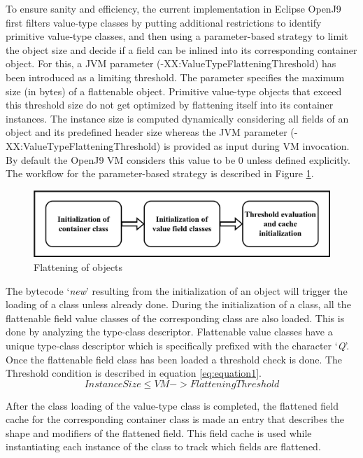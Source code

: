 \documentclass[12 pt, a4paper]{article}
\begin{document}
To ensure sanity and efficiency, the current implementation in Eclipse OpenJ9 \citep{OpenJ9} first filters value-type classes
by 
putting additional restrictions to identify primitive value-type classes, and then using a parameter-based strategy to 
limit the object size and decide if a field can be inlined into its corresponding container object. 
For this, a JVM parameter (-XX:ValueTypeFlatteningThreshold) has been introduced as a limiting
threshold. 
The parameter  specifies the maximum size (in bytes) of a 
flattenable object. 
Primitive value-type objects \citep{JEPP} that exceed this threshold size do not get 
optimized by flattening itself into its container instances. 
The instance size is computed dynamically considering all fields of an object 
and its predefined header size whereas the JVM parameter (-XX:ValueTypeFlatteningThreshold) is 
provided as input during VM invocation. 
By default the OpenJ9 VM 
considers this value to be {0} unless defined explicitly.
The workflow for the parameter-based strategy is described in Figure \ref{fig:Figure 2}.

\begin{figure}[h]
	\vskip 0.2cm
	\centering
	\includegraphics[scale=0.2]{Images/Class_Init.jpg}
	\caption{Flattening of objects}
	\label{fig:Figure 2}
\end{figure}



The bytecode `\textit{new}' resulting from the initialization of an object will trigger the loading 
of a class unless already done. 
During the initialization of a class, all the flattenable field value classes of the 
corresponding class are also loaded. This is done by analyzing the type-class descriptor.
Flattenable value classes have a unique type-class descriptor which is specifically prefixed 
with the character `\textit{Q}'. 
Once the flattenable field class has been loaded a threshold check is done. The Threshold 
condition is described in equation \ref{eq:equation1}.
\begin{equation}
	\label{eq:equation1}
	Instance Size \leq VM->Flattening Threshold
\end{equation} 

After the class loading of the value-type class is completed, the flattened field
cache for the corresponding container class is made an entry that describes the shape and modifiers 
of the flattened field. This field cache is used while instantiating
each instance of the class to track which fields are flattened.  
\clearpage
\end{document}
